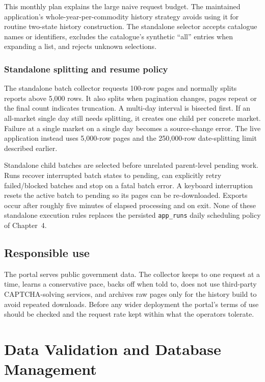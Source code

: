 \documentclass[12pt,a4paper,oneside]{report}
\numberwithin{equation}{chapter}
\numberwithin{figure}{chapter}
\numberwithin{table}{chapter}
\theoremstyle{definition}
\begin{document}
This monthly plan explains the large naive request budget. The maintained application's whole-year-per-commodity history strategy avoids using it for routine two-state history construction. The standalone selector accepts catalogue names or identifiers, excludes the catalogue's synthetic ``all'' entries when expanding a list, and rejects unknown selections.

\subsection{Standalone splitting and resume policy}
The standalone batch collector requests 100-row pages and normally splits reports above 5,000 rows. It also splits when pagination changes, pages repeat or the final count indicates truncation. A multi-day interval is bisected first. If an all-market single day still needs splitting, it creates one child per concrete market. Failure at a single market on a single day becomes a source-change error. The live application instead uses 5,000-row pages and the 250,000-row date-splitting limit described earlier.

Standalone child batches are selected before unrelated parent-level pending work. Runs recover interrupted batch states to pending, can explicitly retry failed/blocked batches and stop on a fatal batch error. A keyboard interruption resets the active batch to pending so its pages can be re-downloaded. Exports occur after roughly five minutes of elapsed processing and on exit. None of these standalone execution rules replaces the persisted \texttt{app\_runs} daily scheduling policy of Chapter~4.

\section{Responsible use}\label{sec:responsible}
The portal serves public government data. The collector keeps to one request at a time, learns a conservative pace, backs off when told to, does not use third-party CAPTCHA-solving services, and archives raw pages only for the history build to avoid repeated downloads. Before any wider deployment the portal's terms of use should be checked and the request rate kept within what the operators tolerate.

\chapter{Data Validation and Database Management}
\end{document}

